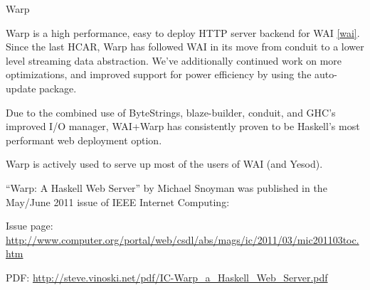 \begin{hcarentry}{Warp}
\label{warp}
\makeheader

Warp is a high performance, easy to deploy HTTP server backend for
WAI \cref{wai}.  Since the last HCAR, Warp has followed WAI in its move from conduit to a lower level streaming data abstraction. We've additionally continued work on more optimizations, and improved support for power efficiency by using the auto-update package.

Due to the combined use of ByteStrings, blaze-builder, conduit, and GHC's improved I/O manager, WAI+Warp has consistently proven to be Haskell's most performant web deployment option.

Warp is actively used to serve up most of the users of WAI (and Yesod).

``Warp: A Haskell Web Server'' by Michael Snoyman was published
in the May/June 2011 issue of IEEE Internet Computing:
\begin{compactitem}
\item
 Issue page: \url{http://www.computer.org/portal/web/csdl/abs/mags/ic/2011/03/mic201103toc.htm}
\item
 PDF: \url{http://steve.vinoski.net/pdf/IC-Warp\_a\_Haskell\_Web\_Server.pdf}
\end{compactitem}
\end{hcarentry}
